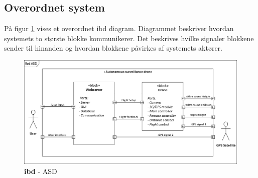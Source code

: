 \subsection{Overordnet system}

På figur \ref{fig:ibd_overordnet} vises et overordnet ibd diagram. Diagrammet beskriver hvordan systemets to største blokke kommunikerer. Det beskrives hvilke signaler blokkene sender til hinanden og hvordan blokkene påvirkes af systemets aktører. 

\begin{figure}[H]
\centering
\includegraphics[width=1\textwidth]{Billeder/IBD/ibd1_overordnet.pdf}
\vspace{-0.5cm}
\caption{\textbf{ibd} - ASD}
\label{fig:ibd_overordnet}
\end{figure}

